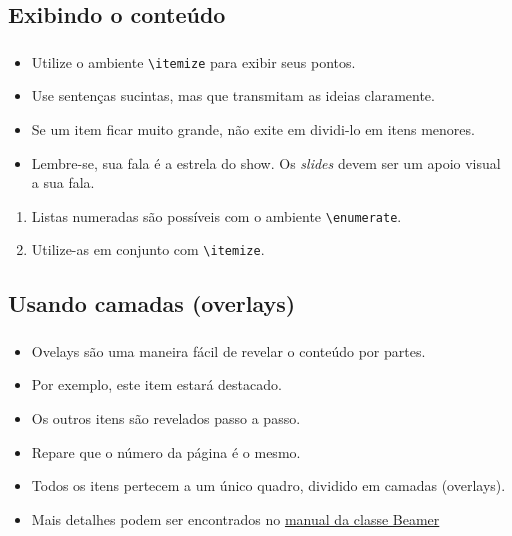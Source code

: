 \documentclass[12pt, xcolor=table, aspectratio=169]{beamer}
\makeatletter
\newcommand*{\currentname}{\@currentlabelname}
\makeatother
\begin{document}
\subsection{Exibindo o conteúdo}
\begin{frame}
\frametitle{\currentname}
  \begin{itemize}
    \item Utilize o ambiente \texttt{{\textbackslash}itemize} para exibir seus pontos.
    \item Use sentenças sucintas, mas que transmitam as ideias claramente.
    \item Se um item ficar muito grande, não exite em dividi-lo em itens menores.
    \item Lembre-se, sua fala é a estrela do show. Os \textit{slides} devem ser um apoio visual a sua fala.
  \end{itemize}
  \begin{enumerate}
   \item Listas numeradas são possíveis com o ambiente \texttt{{\textbackslash}enumerate}.
   \item Utilize-as em conjunto com \texttt{{\textbackslash}itemize}.
  \end{enumerate}

\end{frame}

\subsection{Usando camadas (overlays)}
\begin{frame}
\frametitle{\currentname}

\begin{itemize}
  \item Ovelays são uma maneira fácil de revelar o conteúdo por partes.
  \item<1-|alert@1> Por exemplo, este item estará destacado. 
  \item<2-> Os outros itens são revelados passo a passo.
  \item<3-> Repare que o número da página é o mesmo.
  \item<4-> Todos os itens pertecem a um único quadro, dividido em camadas (overlays).
  \item<5-> Mais detalhes podem ser encontrados no \href{https://tug.ctan.org/macros/latex/contrib/beamer/doc/beameruserguide.pdf}{manual da classe Beamer}
\end{itemize}
\end{frame}
\end{document}
